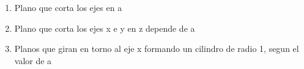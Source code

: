 \documentclass[../practica_01.tex]{subfiles}
\begin{document}
    \begin{enumerate}
        \item Plano que corta los ejes en a
        \item Plano que corta los ejes x e y en z depende de a
        \item Planos que giran en torno al eje x formando un cilindro de radio 1, segun el valor de a
    \end{enumerate}
\end{document}
